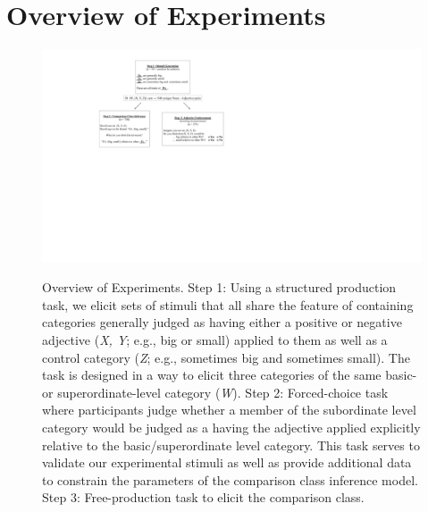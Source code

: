 \documentclass[doc]{apa6}
\begin{document}
  


\section{Overview of Experiments}

\begin{figure}[htb]
{\centering \includegraphics[width=1\textwidth]{figs/expt_overview} }
\caption{Overview of Experiments. Step 1: Using a structured production task, we elicit sets of stimuli that all share the feature of containing categories generally judged as having either a positive or negative adjective  (\emph{X, Y}; e.g., big or small) applied to them as well as a control category (\emph{Z}; e.g., sometimes big and sometimes small). The task is designed in a way to elicit three categories of the same basic- or superordinate-level category (\emph{W}). Step 2: Forced-choice task where participants judge whether a member of the subordinate level category would be judged as a having the adjective applied explicitly relative to the basic/superordinate level category. This task serves to validate our experimental stimuli as well as provide additional data to constrain the parameters of the comparison class inference model. Step 3: Free-production task to elicit the comparison class.}\label{fig:exptOverview}
\end{figure}
\end{document}
